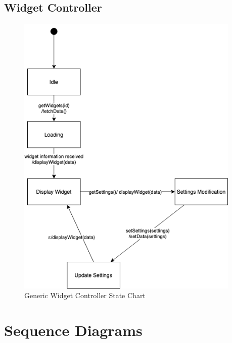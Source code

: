\documentclass[]{article}
\begin{document}
\subsection{Widget Controller}
\label{sub:widget_controller_state}
\begin{figure}[H]
\begin{center}
\includegraphics[width=0.95\textwidth]{D3/images/GenericWidgetController.png}
\end{center}
\caption{Generic Widget Controller State Chart}
\label{fig:Widget Controller State Chart}
\end{figure}

\section{Sequence Diagrams}
\label{sec:sequence_diagrams}
\end{document}
